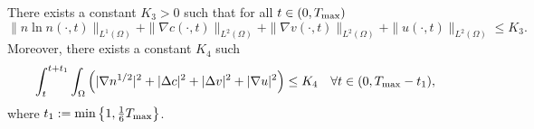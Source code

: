 \documentclass[reqno]{amsart}
\begin{document}
\begin{lemma}\label{lem3.5}
There exists a constant $K_3>0$ such that for all $ t \in (0, T_{\rm max}) $
\begin{equation} \label{eq-3.11}
\|n \ln n (\cdot,t)\|_{L^1(\Omega)} + \|\nabla c(\cdot,t)\|_{L^2(\Omega)}
+ \|\nabla v(\cdot,t)\|_{L^2(\Omega)} + \| u(\cdot,t)\|_{L^2(\Omega)} \leq K_3.
\end{equation}
Moreover, there exists a constant $K_4$ such
\begin{equation} \label{3.18-1}
\int_{t}^{t+t_1}\int_{\Omega}\left(|\nabla n^{1/2}|^2+|\Delta c|^2+|\Delta v|^2
+|\nabla u|^2\right) \le K_4\quad \forall t\in(0,T_{\rm max}-t_1),
\end{equation}
where $t_1:=\min\left\{1,\frac{1}{6}T_{\rm max}\right\}$.
\end{lemma}
\end{document}

